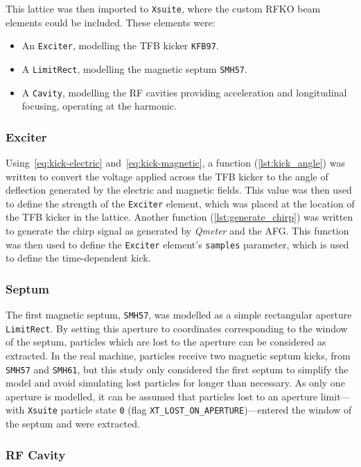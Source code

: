\documentclass[a4paper,twoside,11pt]{report}
\begin{document}
This lattice was then imported to \verb|Xsuite|, where the custom RFKO beam elements could be included. These elements were:
\begin{itemize}
  \item An \verb|Exciter|, modelling the TFB kicker \verb|KFB97|.
  \item A \verb|LimitRect|, modelling the magnetic septum \verb|SMH57|.
  \item A \verb|Cavity|, modelling the RF cavities providing acceleration and longitudinal focusing, operating at the  harmonic.
\end{itemize}

\subsubsection{Exciter}
Using~\autoref{eq:kick-electric} and~\autoref{eq:kick-magnetic}, a function (\autoref{lst:kick_angle}) was written to convert the voltage applied across the TFB kicker to the angle of deflection generated by the electric and magnetic fields. This value was then used to define the strength of the \verb|Exciter| element, which was placed at the location of the TFB kicker in the lattice. Another function (\autoref{lst:generate_chirp}) was written to generate the chirp signal as generated by \textit{Qmeter} and the AFG. This function was then used to define the \verb|Exciter| element's \verb|samples| parameter, which is used to define the time-dependent kick. 

\subsubsection{Septum}\label{sec:septum}
The first magnetic septum, \verb|SMH57|, was modelled as a simple rectangular aperture \verb|LimitRect|. By setting this aperture to coordinates corresponding to the window of the septum, particles which are lost to the aperture can be considered as extracted. In the real machine, particles receive two magnetic septum kicks, from \verb|SMH57| and \verb|SMH61|, but this study only considered the first septum to simplify the model and avoid simulating lost particles for longer than necessary. As only one aperture is modelled, it can be assumed that particles lost to an aperture limit---with \verb|Xsuite| particle state \verb|0| (flag \verb|XT_LOST_ON_APERTURE|)---entered the window of the septum and were extracted. 

\subsubsection{RF Cavity}
\end{document}
